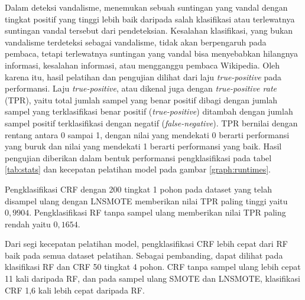 Dalam deteksi vandalisme, menemukan sebuah suntingan yang vandal dengan tingkat
positif yang tinggi lebih baik daripada salah klasifikasi atau terlewatnya
suntingan vandal tersebut dari pendeteksian.
Kesalahan klasifikasi, yang bukan vandalisme terdeteksi sebagai vandalisme,
tidak akan berpengaruh pada pembaca, tetapi terlewatnya suntingan yang vandal
bisa menyebabkan hilangnya informasi, kesalahan informasi, atau mengganggu
pembaca Wikipedia.
Oleh karena itu, hasil pelatihan dan pengujian dilihat dari laju
\textit{true-positive} pada performansi.
Laju \textit{true-positive}, atau dikenal juga dengan
\textit{true-positive rate} (TPR),
yaitu total jumlah sampel yang benar positif dibagi dengan
jumlah sampel yang terklasifikasi benar positif (\textit{true-positive})
ditambah dengan jumlah sampel positif terklasifikasi dengan negatif
(\textit{false-negative}).
TPR bernilai dengan rentang antara 0 sampai 1, dengan nilai yang mendekati 0
berarti performansi yang buruk dan nilai yang mendekati 1 berarti performansi
yang baik.
Hasil pengujian diberikan dalam bentuk performansi pengklasifikasi pada tabel
\ref{tab:stats} dan kecepatan pelatihan model pada gambar \ref{graph:runtimes}.



Pengklasifikasi CRF dengan 200 tingkat 1 pohon pada dataset yang telah disampel
ulang dengan LNSMOTE memberikan nilai TPR paling tinggi yaitu $0,9904$.
Pengklasifikasi RF tanpa sampel ulang memberikan nilai TPR paling rendah yaitu
$0,1654$.



Dari segi kecepatan pelatihan model, pengklasifikasi CRF lebih cepat dari RF
baik pada semua dataset pelatihan.
Sebagai pembanding, dapat dilihat pada klasifikasi RF dan CRF 50 tingkat 4
pohon.
CRF tanpa sampel ulang lebih cepat 11 kali daripada RF, dan pada sampel ulang
SMOTE dan LNSMOTE, klasifikasi CRF 1,6 kali lebih cepat daripada RF.
